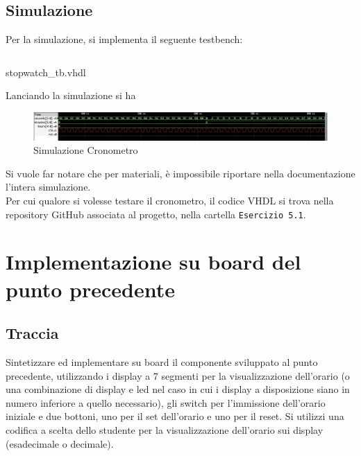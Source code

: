 \subsection{Simulazione}
Per la simulazione, si implementa il seguente testbench:
\begin{code}
    \inputminted[frame=lines, framesep=2mm, baselinestretch=1.2, bgcolor=LightGray, fontsize=\footnotesize, linenos]{vhdl}{vhdl_files/Esercizio_5.1/stopwatch_tb.vhdl}
    \caption{stopwatch\_tb.vhdl}
    \label{lst:stopwatch_tb}
\end{code}

Lanciando la simulazione si ha 
\begin{figure}[H]
	\centering
	\includegraphics[width=1\textwidth]{img/stopwatch_sim}
	\caption{Simulazione Cronometro}
	\label{stpwth_sim} 
\end{figure}
Si vuole far notare che per materiali, è impossibile riportare nella documentazione l'intera simulazione.\\
Per cui qualore si volesse testare il cronometro, il codice VHDL si trova nella repository GitHub associata al progetto, nella cartella \texttt{Esercizio 5.1}.

\section{Implementazione su board del punto precedente}
\subsection{Traccia}
 Sintetizzare ed implementare su board il componente sviluppato al punto precedente, utilizzando i display a 7 segmenti per la visualizzazione dell’orario (o una combinazione di display e led nel caso in cui i display a disposizione siano in numero inferiore a quello necessario), gli switch per l’immissione dell’orario iniziale e due bottoni, uno per il set dell’orario e uno per il reset. Si utilizzi una codifica a scelta dello studente per la visualizzazione dell’orario sui display (esadecimale o decimale).
